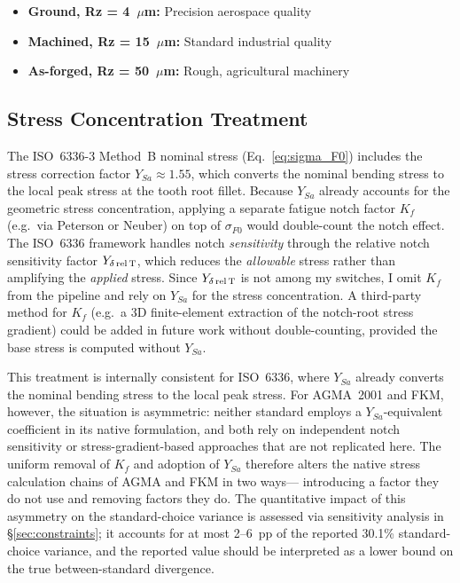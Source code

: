 \documentclass[12pt,a4paper]{article}
\begin{document}
\begin{itemize}
  \item \textbf{Ground, Rz = 4~$\mu$m:} Precision aerospace quality
  \item \textbf{Machined, Rz = 15~$\mu$m:} Standard industrial quality
  \item \textbf{As-forged, Rz = 50~$\mu$m:} Rough, agricultural machinery
\end{itemize}

\subsection{Stress Concentration Treatment}

The ISO~6336-3 Method~B nominal stress (Eq.~\ref{eq:sigma_F0}) includes
the stress correction factor $Y_{Sa} \approx 1.55$, which converts the
nominal bending stress to the local peak stress at the tooth root
fillet. Because $Y_{Sa}$ already accounts for the geometric stress
concentration, applying a separate fatigue notch factor $K_f$ (e.g.\
via Peterson or Neuber) on top of $\sigma_{F0}$ would double-count the
notch effect. The ISO~6336 framework handles notch \emph{sensitivity}
through the relative notch sensitivity factor $Y_{\delta\,\rm rel\,T}$,
which reduces the \emph{allowable} stress rather than amplifying the
\emph{applied} stress. Since $Y_{\delta\,\rm rel\,T}$ is not among my
switches, I omit $K_f$ from the pipeline and rely on $Y_{Sa}$ for the
stress concentration. A third-party method for $K_f$ (e.g.\ a 3D
finite-element extraction of the notch-root stress gradient) could be
added in future work without double-counting, provided the base stress
is computed without $Y_{Sa}$.

This treatment is internally consistent for ISO~6336, where $Y_{Sa}$
already converts the nominal bending stress to the local peak stress.
For AGMA~2001 and FKM, however, the situation is asymmetric: neither
standard employs a $Y_{Sa}$-equivalent coefficient in its native
formulation, and both rely on independent notch sensitivity or
stress-gradient-based approaches that are not replicated here. The
uniform removal of $K_f$ and adoption of $Y_{Sa}$ therefore alters the
native stress calculation chains of AGMA and FKM in two ways---%
introducing a factor they do not use and removing factors they do.
The quantitative impact of this asymmetry on the standard-choice
variance is assessed via sensitivity analysis in \S\ref{sec:constraints}; it accounts for at most 2--6~pp of the
reported 30.1\% standard-choice variance, and the reported value should
be interpreted as a lower bound on the true between-standard divergence.
\end{document}
